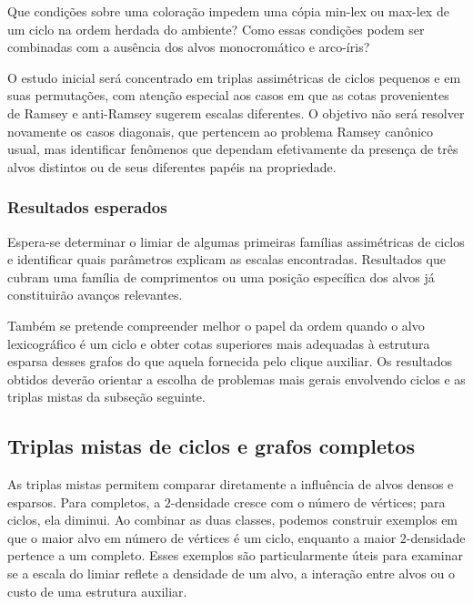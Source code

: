 \documentclass[11pt,a4paper]{article}
\theoremstyle{plain}
\theoremstyle{definition}
\newcounter{question}[section]
\renewcommand{\thequestion}{\thesection.\arabic{question}}
\newenvironment{question}[1][]{%
  \refstepcounter{question}%
  \begin{tcolorbox}[
    enhanced,
    colback=qbluebg,
    colframe=qblue,
    arc=4pt,
    boxrule=1.2pt,
    left=8pt, right=8pt, top=6pt, bottom=6pt,
    fonttitle=\bfseries\sffamily,
    title={\color{white}Pergunta~\thequestion\ifx&#1&\else\ (#1)\fi},
    coltitle=white,
    attach boxed title to top left={yshift=-2mm, xshift=6pt},
    boxed title style={colback=qblue, arc=3pt, boxrule=0pt},
  ]%
  \itshape
}{%
  \end{tcolorbox}%
}
\begin{document}
\begin{question}
  \label{q:ordem}
  Que condições sobre uma coloração impedem uma cópia min-lex ou
  max-lex de um ciclo na ordem herdada do ambiente? Como essas
  condições podem ser combinadas com a ausência dos alvos
  monocromático e arco-íris?
\end{question}

O estudo inicial será concentrado em triplas assimétricas de ciclos
pequenos e em suas permutações, com atenção especial aos casos em
que as cotas provenientes de Ramsey e anti-Ramsey sugerem escalas
diferentes. O objetivo não será resolver novamente os casos
diagonais, que pertencem ao problema Ramsey canônico usual, mas
identificar fenômenos que dependam efetivamente da presença de três
alvos distintos ou de seus diferentes papéis na propriedade.

\subsubsection{Resultados esperados}

Espera-se determinar o limiar de algumas primeiras famílias
assimétricas de ciclos e identificar quais parâmetros explicam as
escalas encontradas. Resultados que cubram uma família de
comprimentos ou uma posição específica dos alvos já constituirão
avanços relevantes.

Também se pretende compreender melhor o papel da ordem quando o alvo
lexicográfico é um ciclo e obter cotas superiores mais adequadas à
estrutura esparsa desses grafos do que aquela fornecida pelo clique
auxiliar. Os resultados obtidos deverão orientar a escolha de
problemas mais gerais envolvendo ciclos e as triplas mistas da
subseção seguinte.

\subsection{Triplas mistas de ciclos e grafos completos}
\label{sec:mistas}


As triplas mistas permitem comparar diretamente a influência de alvos
densos e esparsos. Para completos, a $2$-densidade cresce com o número
de vértices; para ciclos, ela diminui. Ao combinar as duas classes,
podemos construir exemplos em que o maior alvo em número de vértices
é um ciclo, enquanto a maior $2$-densidade pertence a um completo.
Esses exemplos são particularmente úteis para examinar se a escala
do limiar reflete a densidade de um alvo, a interação entre alvos ou
o custo de uma estrutura auxiliar.
\end{document}
